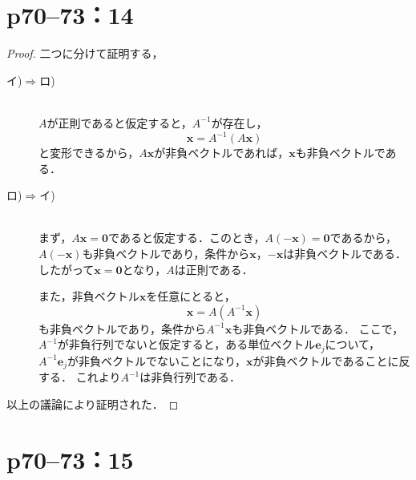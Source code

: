\documentclass[a4paper,10pt,fleqn]{ltjsarticle}
\begin{document}
\newpage


\section*{p70--73：14}

\begin{leftbar}
    \begin{proof}
        二つに分けて証明する，
        \begin{description}
            \item[イ)$\Longrightarrow$ロ)] \mbox{} \\
                  $A$が正則であると仮定すると，$A^{-1}$が存在し，
                  \[
                      \bm{x} = A^{-1} (A\bm{x})
                  \]
                  と変形できるから，$A \bm{x}$が非負ベクトルであれば，$\bm{x}$も非負ベクトルである．
            \item[ロ)$\Longrightarrow$イ)] \mbox{} \\
                  まず，$ A \bm{x} =\bm{0}$であると仮定する．このとき，$A (-\bm{x}) =\bm{0}$であるから，
                  $A (-\bm{x})$も非負ベクトルであり，条件から$ \bm{x}$，$-\bm{x}$は非負ベクトルである．
                  したがって$\bm{x}=\bm{0}$となり，$A$は正則である．

                  また，非負ベクトル$\bm{x}$を任意にとると，
                  \[
                      \bm{x} = A (A^{-1} \bm{x})
                  \]
                  も非負ベクトルであり，条件から$A^{-1} \bm{x}$も非負ベクトルである．
                  ここで，$A^{-1}$が非負行列でないと仮定すると，ある単位ベクトル$\bm{e}_j$について，
                  $A^{-1} \bm{e}_j $が非負ベクトルでないことになり，$\bm{x}$が非負ベクトルであることに反する．
                  これより$A^{-1}$は非負行列である．
        \end{description}
        以上の議論により証明された．
    \end{proof}
\end{leftbar}


\newpage



\section*{p70--73：15}
\end{document}
